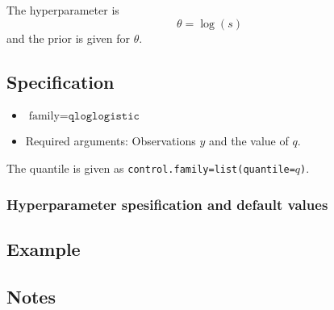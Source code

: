 \documentclass[a4paper,11pt]{article}
\begin{document}
The hyperparameter is
\begin{displaymath}
    \theta = \log(s)
\end{displaymath}
and the prior is given for $\theta$.


\subsection*{Specification}

\begin{itemize}
\item $\text{family}=\texttt{qloglogistic}$
\item Required arguments: Observations $y$ and the value of $q$.
\end{itemize}
The quantile is given as \texttt{control.family=list(quantile=$q$)}.

\subsubsection*{Hyperparameter spesification and default values}


\subsection*{Example}



\subsection*{Notes}
\end{document}
